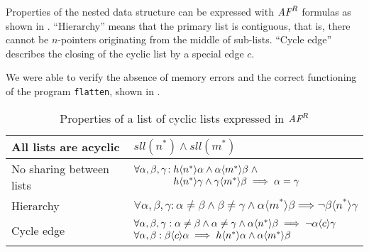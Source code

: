 \documentclass[11pt,a4paper,oneside,draft]{article}
\theoremstyle{definition}
\theoremstyle{remark}
\begin{document}
Properties of the nested data structure can be expressed with $\mbox{$\textit{AF}^R$}$ formulas
as shown in . ``Hierarchy'' means
that the primary list is contiguous, that is, there cannot be $n$-pointers
originating from the middle of sub-lists. ``Cycle edge'' describes the closing
of the cyclic list by a special edge $c$.

We were able to verify the absence of memory errors and the correct 
functioning of the program {\tt flatten}, shown in .

\bgroup

\newcommand\via[1]{\langle #1 \rangle}

\newcommand\vianpre{\via{\underline{n}}}
\newcommand\vianrtcpre{\via{\underline{n}^*}}
\newcommand\vianrtc{\via{n^*}}
\newcommand\viamrtc{\via{m^*}}
\newcommand\viarrtc{\via{r^*}}

\renewcommand\a{\alpha}
\renewcommand\b{\beta}
\renewcommand\c{\gamma}

\newcommand\nn[2]{#1\vianrtc #2}
\newcommand\mm[2]{#1\viamrtc #2}
\newcommand\clink[2]{#1\via{c}#2}

\begin{table}
\centering
\begin{tabular}{|l|l|}
\hline
  All lists are acyclic & $sll(n^*) \land sll(m^*)$ \\
\hline
  No sharing between lists &
   $\begin{array}{@{}l@{\;}l}
      \forall\a,\b,\c\!:  &\nn h\a \land \mm\a\b \;\land\\ 
                          &\nn h\c \land \mm\c\b \implies \a=\c
    \end{array}$ \\
\hline
  Hierarchy &
   $\forall \a,\b,\c:  \a\neq\b \land \b\neq\c \land \mm\a\b \implies \lnot\nn\b\c$ \\
\hline
  Cycle edge &
   $\begin{array}{@{}l@{\;}l}
      \forall \a,\b,\c: \a\neq\b \land \a\neq\c \land \nn\a\b \implies \lnot \clink\a\c \\
      \forall \a,\b: \clink\b\a \implies \nn h\a \land \mm\a\b
    \end{array}$ \\
\hline
\end{tabular}
\caption{\label{Ta:nested-cyclic-list-props}Properties of a list of cyclic lists expressed in $\mbox{$\textit{AF}^R$}$}
\end{table}
\end{document}
